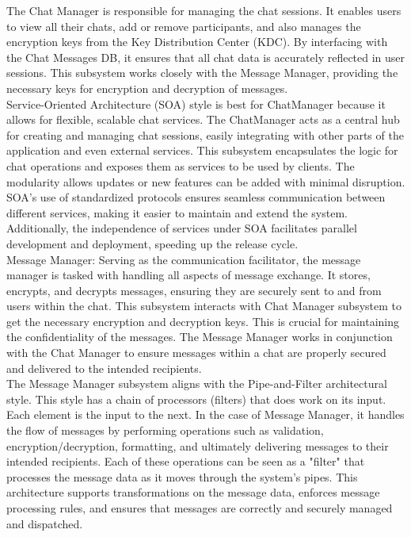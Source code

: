 \documentclass[]{article}
\begin{document}
The Chat Manager is responsible for managing the chat sessions. It enables users to view all their chats, add or remove participants, and also manages the encryption keys from the Key Distribution Center (KDC). By interfacing with the Chat Messages DB, it ensures that all chat data is accurately reflected in user sessions. This subsystem works closely with the Message Manager, providing the necessary keys for encryption and decryption of messages. \\

Service-Oriented Architecture (SOA) style is best for ChatManager because it allows for flexible, scalable chat services. The ChatManager acts as a central hub for creating and managing chat sessions, easily integrating with other parts of the application and even external services. This subsystem encapsulates the logic for chat operations and exposes them as services to be used by clients. The modularity allows updates or new features can be added with minimal disruption. SOA's use of standardized protocols ensures seamless communication between different services, making it easier to maintain and extend the system. Additionally, the independence of services under SOA facilitates parallel development and deployment, speeding up the release cycle. \\

Message Manager: Serving as the communication facilitator, the message manager is tasked with handling all aspects of message exchange. It stores, encrypts, and decrypts messages, ensuring they are securely sent to and from users within the chat. This subsystem interacts with Chat Manager subsystem to get the necessary encryption and decryption keys. This is crucial for maintaining the confidentiality of the messages. The Message Manager works in conjunction with the Chat Manager to ensure messages within a chat are properly secured and delivered to the intended recipients. \\

The Message Manager subsystem aligns with the Pipe-and-Filter architectural style. This style has a chain of processors (filters) that does work on its input. Each element is the input to the next. In the case of Message Manager, it handles the flow of messages by performing operations such as validation, encryption/decryption, formatting, and ultimately delivering messages to their intended recipients. Each of these operations can be seen as a "filter" that processes the message data as it moves through the system's pipes. This architecture supports transformations on the message data, enforces message processing rules, and ensures that messages are correctly and securely managed and dispatched.\\
\end{document}
